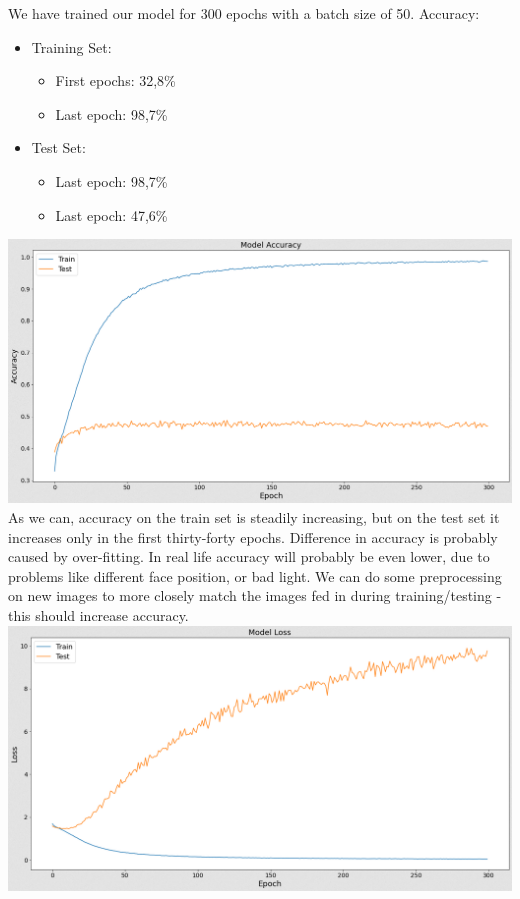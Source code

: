 We have trained our model for 300 epochs with a batch size of 50.
Accuracy:
\begin{itemize}
      \item Training Set:
        \begin{itemize}
            \item First epochs: 32,8\%
            \item Last epoch: 98,7\%
        \end{itemize}
      \item Test Set:
        \begin{itemize}
            \item Last epoch: 98,7\%
            \item Last epoch: 47,6\%
        \end{itemize}
\end{itemize}
\includegraphics[scale=0.5]{images/modelOne/accOne.png}
As we can, accuracy on the train set is steadily increasing, but on the test set it increases only in the first thirty-forty epochs. Difference in accuracy is probably caused by over-fitting. In real life accuracy will probably be even lower, due to problems like different face position, or bad light. We can do some preprocessing on new images to more closely match the images fed in during training/testing - this should increase accuracy.\\
\includegraphics[scale=0.5]{images/modelOne/lossOne.png}
